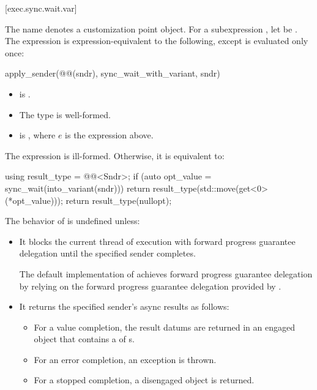[exec.sync.wait.var]{}

\pnum
The name  denotes
a customization point object.
For a subexpression ,
let  be .
The expression 
is expression-equivalent to the following,
except  is evaluated only once:
\begin{codeblock}
apply_sender(@@(sndr), sync_wait_with_variant, sndr)
\end{codeblock}
\mandates
\begin{itemize}
\item
{} is .
\item
The type 
is well-formed.
\item
{}
is , where $e$ is the  expression above.
\end{itemize}

\pnum
The expression  is ill-formed.
Otherwise, it is equivalent to:
\begin{codeblock}
using result_type = @@<Sndr>;
if (auto opt_value = sync_wait(into_variant(sndr))) {
  return result_type(std::move(get<0>(*opt_value)));
}
return result_type(nullopt);
\end{codeblock}

\pnum
The behavior of 
is undefined unless:
\begin{itemize}
\item
It blocks the current thread of execution
with forward progress guarantee delegation
until the specified sender completes.
\begin{note}
The default implementation of  achieves
forward progress guarantee delegation by relying on
the forward progress guarantee delegation provided by .
\end{note}
\item
It returns the specified sender's async results as follows:
\begin{itemize}
\item
For a value completion,
the result datums are returned in an engaged  object
that contains a  of s.
\item
For an error completion, an exception is thrown.
\item
For a stopped completion, a disengaged  object is returned.
\end{itemize}
\end{itemize}

